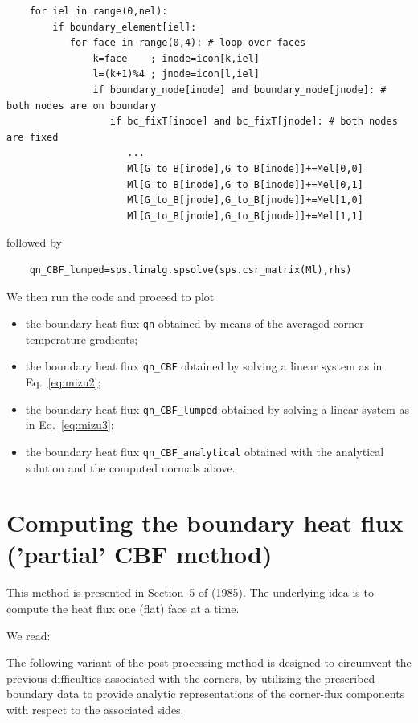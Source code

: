 \begin{lstlisting}
    for iel in range(0,nel):
        if boundary_element[iel]:
           for face in range(0,4): # loop over faces
               k=face    ; inode=icon[k,iel]
               l=(k+1)%4 ; jnode=icon[l,iel]
               if boundary_node[inode] and boundary_node[jnode]: # both nodes are on boundary
                  if bc_fixT[inode] and bc_fixT[jnode]: # both nodes are fixed
                     ...
                     Ml[G_to_B[inode],G_to_B[inode]]+=Mel[0,0]
                     Ml[G_to_B[inode],G_to_B[inode]]+=Mel[0,1]
                     Ml[G_to_B[jnode],G_to_B[jnode]]+=Mel[1,0]
                     Ml[G_to_B[jnode],G_to_B[jnode]]+=Mel[1,1]
\end{lstlisting}
followed by 
\begin{lstlisting}
    qn_CBF_lumped=sps.linalg.spsolve(sps.csr_matrix(Ml),rhs)
\end{lstlisting}

We then run the code and proceed to plot
\begin{itemize}
\item the boundary heat flux \lstinline{qn} obtained by means of the averaged corner 
temperature gradients;
\item the boundary heat flux \lstinline{qn_CBF} obtained by solving a linear system as in Eq.~\eqref{eq:mizu2};
\item the boundary heat flux \lstinline{qn_CBF_lumped} obtained by solving a linear system as in Eq.~\eqref{eq:mizu3};
\item the boundary heat flux \lstinline{qn_CBF_analytical} obtained with the analytical solution and the 
computed normals above. 
\end{itemize}

\section*{Computing the boundary heat flux ('partial' CBF method)}

This method is presented in Section~5 of \textcite{cacs85} (1985).
The underlying idea is to compute the heat flux one (flat) face at a time.

We read:
\begin{displayquote}
The following variant of the post-processing method is designed to circumvent the previous
difficulties associated with the corners, by utilizing the prescribed boundary data to provide
analytic representations of the corner-flux components with respect to the associated sides.
\end{displayquote}

